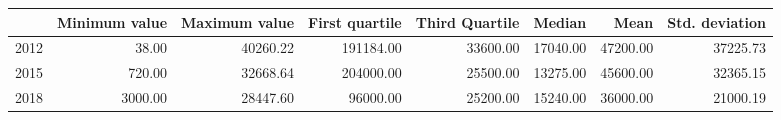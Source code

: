\begin{table}[ht]
\centering
\begin{tabular}{rrrrrrrr}
  \hline
 & Minimum value & Maximum value & First quartile & Third Quartile & Median & Mean & Std. deviation \\ 
  \hline
2012 & 38.00 & 40260.22 & 191184.00 & 33600.00 & 17040.00 & 47200.00 & 37225.73 \\ 
  2015 & 720.00 & 32668.64 & 204000.00 & 25500.00 & 13275.00 & 45600.00 & 32365.15 \\ 
  2018 & 3000.00 & 28447.60 & 96000.00 & 25200.00 & 15240.00 & 36000.00 & 21000.19 \\ 
   \hline
\end{tabular}
\end{table}
